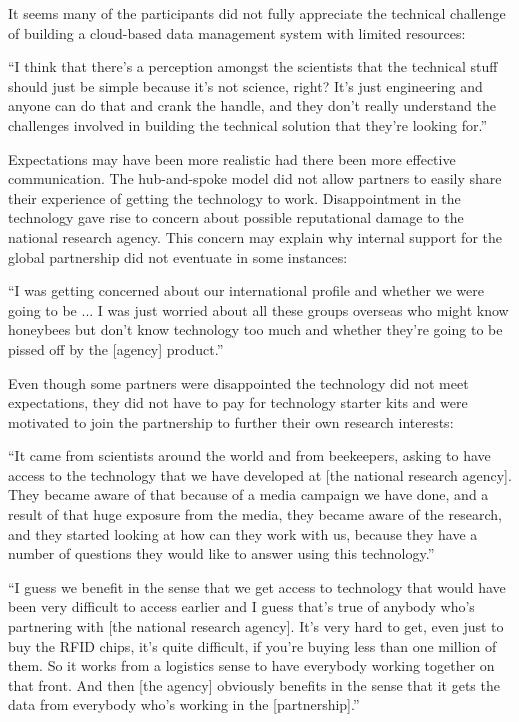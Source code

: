 It seems many of the participants did not fully appreciate the technical challenge of building a cloud-based data management system with limited resources:

\begin{displayquote}[Participant 16/3]
\small
\enquote{I think that there's a perception amongst the scientists that the technical stuff should just be simple because it's not science, right? It's just engineering and anyone can do that and crank the handle, and they don't really understand the challenges involved in building the technical solution that they're looking for.} 
\end{displayquote}

Expectations may have been more realistic had there been more effective communication. The hub-and-spoke model did not allow partners to easily share their experience of getting the technology to work. Disappointment in the technology gave rise to concern about possible reputational damage to the national research agency. This concern may explain why internal support for the global partnership did not eventuate in some instances:

\begin{displayquote}[Participant 22/3]
\small
\enquote{I was getting concerned about our international profile and whether we were going to be ... I was just worried about all these groups overseas who might know honeybees but don't know technology too much and whether they're going to be pissed off by the [agency] product.} 
\end{displayquote}

Even though some partners were disappointed the technology did not meet expectations, they did not have to pay for technology starter kits and were motivated to join the partnership to further their own research interests:

\begin{displayquote}[Participant 10/3]
\small
\enquote{It came from scientists around the world and from beekeepers, asking to have access to the technology that we have developed at [the national research agency]. They became aware of that because of a media campaign we have done, and a result of that huge exposure from the media, they became aware of the research, and they started looking at how can they work with us, because they have a number of questions they would like to answer using this technology.} 
\end{displayquote}

\begin{displayquote}[Participant 41/3]
\small
\enquote{I guess we benefit in the sense that we get access to technology that would have been very difficult to access earlier and I guess that's true of anybody who’s partnering with [the national research agency]. It's very hard to get, even just to buy the RFID chips, it's quite difficult, if you're buying less than one million of them. So it works from a logistics sense to have everybody working together on that front. And then [the agency] obviously benefits in the sense that it gets the data from everybody who's working in the [partnership].} 
\end{displayquote}
 
